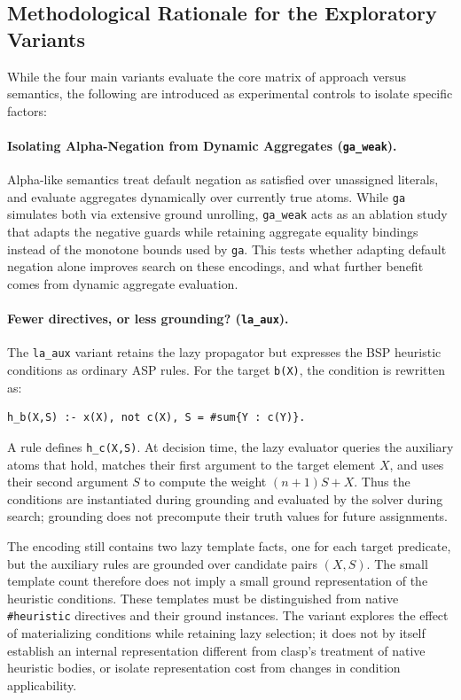 \subsection{Methodological Rationale for the Exploratory Variants}
\label{sec:exploratory-methodology}

While the four main variants evaluate the core matrix of approach versus semantics, the following are introduced as experimental controls to isolate specific factors:

\paragraph{Isolating Alpha-Negation from Dynamic Aggregates (\texttt{ga\_weak}).}
Alpha-like semantics treat default negation as satisfied over unassigned literals, and evaluate aggregates dynamically over currently true atoms. While \texttt{ga} simulates both via extensive ground unrolling, \texttt{ga\_weak} acts as an ablation study that adapts the negative guards while retaining aggregate equality bindings instead of the monotone bounds used by \texttt{ga}. This tests whether adapting default negation alone improves search on these encodings, and what further benefit comes from dynamic aggregate evaluation.

\paragraph{Fewer directives, or less grounding? (\texttt{la\_aux}).}
The \texttt{la\_aux} variant retains the lazy propagator but expresses the BSP heuristic conditions as ordinary ASP rules. For the target \texttt{b(X)}, the condition is rewritten as:
\begin{verbatim}
h_b(X,S) :- x(X), not c(X), S = #sum{Y : c(Y)}.
\end{verbatim}
A rule defines \texttt{h\_c(X,S)}. At decision time, the lazy evaluator queries the auxiliary atoms that hold, matches their first argument to the target element $X$, and uses their second argument $S$ to compute the weight $(n+1)S+X$. Thus the conditions are instantiated during grounding and evaluated by the solver during search; grounding does not precompute their truth values for future assignments.

The encoding still contains two lazy template facts, one for each target predicate, but the auxiliary rules are grounded over candidate pairs $(X,S)$. The small template count therefore does not imply a small ground representation of the heuristic conditions. These templates must be distinguished from native \texttt{\#heuristic} directives and their ground instances. The variant explores the effect of materializing conditions while retaining lazy selection; it does not by itself establish an internal representation different from clasp's treatment of native heuristic bodies, or isolate representation cost from changes in condition applicability.

